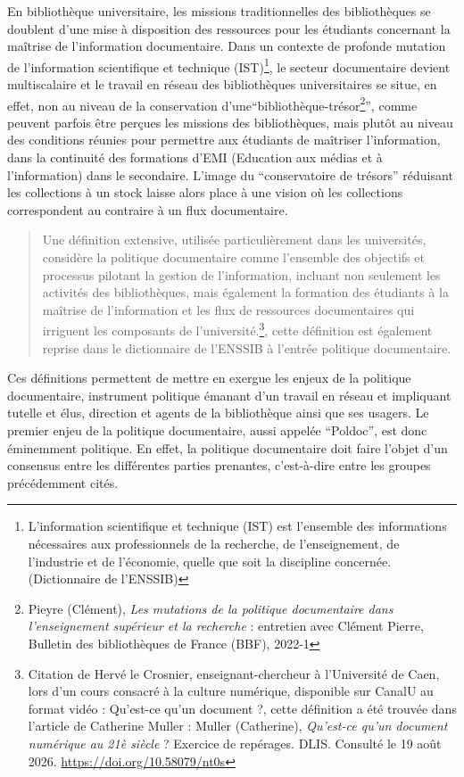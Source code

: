 En bibliothèque universitaire, les missions traditionnelles des bibliothèques se doublent d'une mise à disposition des ressources pour les étudiants concernant la maîtrise de l'information documentaire. Dans un contexte de profonde mutation de l'information scientifique et technique (IST)\footnote{L’information scientifique et technique (IST) est l’ensemble des informations nécessaires aux professionnels de la recherche, de l'enseignement, de l'industrie et de l'économie, quelle que soit la discipline concernée. (Dictionnaire de l'ENSSIB) }, le secteur documentaire devient multiscalaire et le travail en réseau des bibliothèques universitaires se situe, en effet, non au niveau de la conservation d'une\enquote{bibliothèque-trésor\footnote{Pieyre (Clément), \textit{Les mutations de la politique documentaire dans l'enseignement supérieur et la recherche} :  entretien avec Clément Pierre, Bulletin des bibliothèques de France (BBF), 2022-1}}, comme peuvent parfois être perçues les missions des bibliothèques,  mais plutôt au niveau des conditions réunies pour permettre aux étudiants de maîtriser l'information, dans la continuité des formations d'EMI (Education aux médias et à l'information) dans le secondaire. L'image du \enquote{conservatoire de trésors} réduisant les collections à un stock laisse alors place à une vision où les collections correspondent au contraire à un flux documentaire.
\begin{quotation}
	Une définition extensive, utilisée particulièrement dans les universités, considère la politique documentaire comme l'ensemble des objectifs et processus pilotant la gestion de l'information, incluant non seulement les activités des bibliothèques, mais également la formation des étudiants à la maîtrise de l'information et les flux de ressources documentaires qui irriguent les composants de l'université.\footnote{Citation de Hervé le Crosnier, enseignant-chercheur à l’Université de Caen, lors d'un cours consacré à la culture numérique, disponible sur CanalU au format vidéo :  Qu’est-ce qu’un document ?, cette définition a été trouvée dans l'article de Catherine Muller : Muller (Catherine), \textit{Qu’est-ce qu’un document numérique au 21è siècle }? Exercice de repérages. DLIS. Consulté le 19 août 2026. \url {https://doi.org/10.58079/nt0s}}, cette définition est également reprise dans le dictionnaire de l'ENSSIB à l'entrée politique documentaire.
\end{quotation}

Ces définitions permettent de mettre en exergue les enjeux de la politique documentaire, instrument politique émanant d'un travail en réseau et impliquant tutelle et élus, direction et agents de la bibliothèque ainsi que ses usagers. Le premier enjeu de la politique documentaire, aussi appelée \enquote{Poldoc}, est donc éminemment politique. En effet, la politique documentaire doit faire l'objet d'un consensus entre les différentes parties prenantes, c'est-à-dire entre les groupes précédemment cités.

